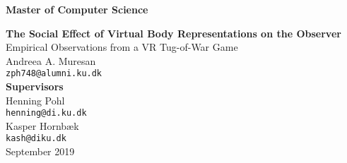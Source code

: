 \documentclass[12pt,a4paper,oneside]{article}
\begin{document}
\raggedbottom
    \thispagestyle{empty}
 
    \vspace*{-1cm}
    \begin{center}
        \textbf{\Large Master of Computer Science} \\
    \end{center}
    \vspace*{5cm} 
    \begin{center}
    \textbf{\Huge The Social Effect of Virtual Body Representations on the
Observer} \\
    \vspace*{1cm} 
    {\Large Empirical Observations from a VR Tug-of-War Game} \\
      \vspace*{1cm} 
    Andreea A. Muresan \\
    \texttt{zph748@alumni.ku.dk} \\
     \vspace*{1cm} 
    \textbf{\large Supervisors} \\
         \vspace*{0.2cm} 
    Henning Pohl  \\
    \texttt{henning@di.ku.dk} \\
         \vspace*{0.2cm} 
    Kasper Hornbæk \\
    \texttt{kash@diku.dk} \\
       \vspace*{1cm} 
   September 2019
   
 \end{center}
\newpage
\ClearWallPaper

\tableofcontents
{}
\newpage
\ClearWallPaper














\medskip



\end{document}
